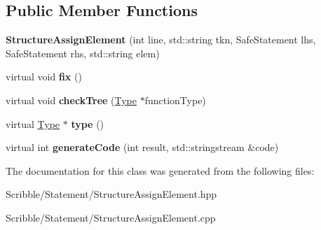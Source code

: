 \subsection*{Public Member Functions}
\begin{DoxyCompactItemize}
\item 
\hypertarget{class_structure_assign_element_a15f5eb9405b179dd112afa926f204eff}{{\bfseries Structure\-Assign\-Element} (int line, std\-::string tkn, Safe\-Statement lhs, Safe\-Statement rhs, std\-::string elem)}\label{class_structure_assign_element_a15f5eb9405b179dd112afa926f204eff}

\item 
\hypertarget{class_structure_assign_element_a0538bfb357a08e344bdc1c0c655d5fc6}{virtual void {\bfseries fix} ()}\label{class_structure_assign_element_a0538bfb357a08e344bdc1c0c655d5fc6}

\item 
\hypertarget{class_structure_assign_element_a7f1dee7549e62965fd871740957dd8fa}{virtual void {\bfseries check\-Tree} (\hyperlink{class_type}{Type} $\ast$function\-Type)}\label{class_structure_assign_element_a7f1dee7549e62965fd871740957dd8fa}

\item 
\hypertarget{class_structure_assign_element_a2c342b38945416b06100fb1b2d074573}{virtual \hyperlink{class_type}{Type} $\ast$ {\bfseries type} ()}\label{class_structure_assign_element_a2c342b38945416b06100fb1b2d074573}

\item 
\hypertarget{class_structure_assign_element_aca6c28cef07f70f8610dc6ac8989942b}{virtual int {\bfseries generate\-Code} (int result, std\-::stringstream \&code)}\label{class_structure_assign_element_aca6c28cef07f70f8610dc6ac8989942b}

\end{DoxyCompactItemize}


The documentation for this class was generated from the following files\-:\begin{DoxyCompactItemize}
\item 
Scribble/\-Statement/Structure\-Assign\-Element.\-hpp\item 
Scribble/\-Statement/Structure\-Assign\-Element.\-cpp\end{DoxyCompactItemize}
